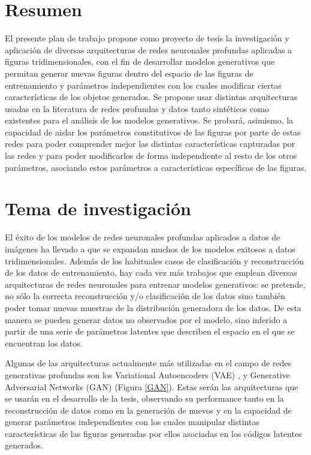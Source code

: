 \documentclass[spanish]{article}
\begin{document}


\section{Resumen}
El presente plan de trabajo propone como proyecto de tesis la investigación y aplicación de diversas arquitecturas de redes neuronales profundas aplicadas a figuras tridimensionales, con el fin de desarrollar modelos generativos que permitan generar nuevas figuras dentro del espacio de las figuras de entrenamiento y parámetros independientes con los cuales modificar ciertas características de los objetos generados. Se propone usar distintas arquitecturas usadas en la literatura de redes profundas y datos tanto sintéticos como existentes para el análisis de los modelos generativos. Se probará, asimismo, la capacidad de aislar los parámetros constitutivos de las figuras por parte de estas redes para poder comprender mejor las distintas características capturadas por las redes y para poder modificarlos de forma independiente al resto de los otros parámetros, asociando estos parámetros a características específicas de las figuras.

\section{Tema de investigación}
El éxito de los modelos de redes neuronales profundas aplicados a datos de imágenes ha llevado a que se expandan muchos de los modelos exitosos a datos tridimensionales. Además de los habituales casos de clasificación y reconstrucción de los datos de entrenamiento, hay cada vez más trabajos que emplean diversas arquitecturas de redes neuronales para entrenar modelos generativos: se pretende, no sólo la correcta reconstrucción y/o clasificación de los datos sino también poder tomar nuevas muestras de la distribución generadora de los datos. De esta manera se pueden generar datos no observados por el modelo, sino inferido a partir de una serie de parámetros latentes que describen el espacio en el que se encuentran los datos.

Algunas de las arquitecturas actualmente más utilizadas en el campo de redes generativas profundas son los Variational Autoencoders (VAE) \cite{Kingma2013}, y Generative Adversarial Networks (GAN) \cite{Goodfellow2014} (Figura \ref{GAN}). Estas serán las arquitecturas que se usarán en el desarrollo de la tesis, observando su performance tanto en la reconstrucción de datos como en la generación de nuevos y en la capacidad de generar parámetros independientes con los cuales manipular distintas características de las figuras generadas por ellos asociadas en los códigos latentes generados.
\end{document}
